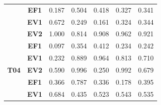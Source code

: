 \begin{table}[htbp]
\begin{tabular}{|ccccccc|}
		\rowcolor[HTML]{F2F2F2} 
		\multicolumn{1}{|c|}{\cellcolor[HTML]{F2F2F2}} & \multicolumn{1}{c|}{\cellcolor[HTML]{F2F2F2}\textbf{EF1}} & \multicolumn{1}{c|}{\cellcolor[HTML]{F2F2F2}0.187} & \multicolumn{1}{c|}{\cellcolor[HTML]{F2F2F2}0.504} & \multicolumn{1}{c|}{\cellcolor[HTML]{F2F2F2}0.418} & \multicolumn{1}{c|}{\cellcolor[HTML]{F2F2F2}0.327} & 0.341 \\ \cline{2-7} 
		\multicolumn{1}{|c|}{\cellcolor[HTML]{F2F2F2}} & \multicolumn{1}{c|}{\textbf{EV1}} & \multicolumn{1}{c|}{0.672} & \multicolumn{1}{c|}{0.249} & \multicolumn{1}{c|}{0.161} & \multicolumn{1}{c|}{0.324} & 0.344 \\ \cline{2-7} 
		\rowcolor[HTML]{F2F2F2} 
		\multicolumn{1}{|c|}{\multirow{-3}{*}{\cellcolor[HTML]{F2F2F2}\textbf{T03}}} & \multicolumn{1}{c|}{\cellcolor[HTML]{F2F2F2}\textbf{EV2}} & \multicolumn{1}{c|}{\cellcolor[HTML]{F2F2F2}1.000} & \multicolumn{1}{c|}{\cellcolor[HTML]{F2F2F2}0.814} & \multicolumn{1}{c|}{\cellcolor[HTML]{F2F2F2}0.908} & \multicolumn{1}{c|}{\cellcolor[HTML]{F2F2F2}0.962} & 0.921 \\ \hline
		\multicolumn{1}{|c|}{\cellcolor[HTML]{F2F2F2}} & \multicolumn{1}{c|}{\textbf{EF1}} & \multicolumn{1}{c|}{0.097} & \multicolumn{1}{c|}{0.354} & \multicolumn{1}{c|}{0.412} & \multicolumn{1}{c|}{0.234} & 0.242 \\ \cline{2-7} 
		\rowcolor[HTML]{F2F2F2} 
		\multicolumn{1}{|c|}{\cellcolor[HTML]{F2F2F2}} & \multicolumn{1}{c|}{\cellcolor[HTML]{F2F2F2}\textbf{EV1}} & \multicolumn{1}{c|}{\cellcolor[HTML]{F2F2F2}0.232} & \multicolumn{1}{c|}{\cellcolor[HTML]{F2F2F2}0.889} & \multicolumn{1}{c|}{\cellcolor[HTML]{F2F2F2}0.964} & \multicolumn{1}{c|}{\cellcolor[HTML]{F2F2F2}0.813} & 0.710 \\ \cline{2-7} 
		\multicolumn{1}{|c|}{\multirow{-3}{*}{\cellcolor[HTML]{F2F2F2}\textbf{T04}}} & \multicolumn{1}{c|}{\textbf{EV2}} & \multicolumn{1}{c|}{0.590} & \multicolumn{1}{c|}{0.996} & \multicolumn{1}{c|}{0.250} & \multicolumn{1}{c|}{0.992} & 0.679 \\ \hline
		\rowcolor[HTML]{F2F2F2} 
		\multicolumn{1}{|c|}{\cellcolor[HTML]{F2F2F2}} & \multicolumn{1}{c|}{\cellcolor[HTML]{F2F2F2}\textbf{EF1}} & \multicolumn{1}{c|}{\cellcolor[HTML]{F2F2F2}0.366} & \multicolumn{1}{c|}{\cellcolor[HTML]{F2F2F2}0.787} & \multicolumn{1}{c|}{\cellcolor[HTML]{F2F2F2}0.336} & \multicolumn{1}{c|}{\cellcolor[HTML]{F2F2F2}0.178} & 0.395 \\ \cline{2-7} 
		\multicolumn{1}{|c|}{\cellcolor[HTML]{F2F2F2}} & \multicolumn{1}{c|}{\textbf{EV1}} & \multicolumn{1}{c|}{0.684} & \multicolumn{1}{c|}{0.435} & \multicolumn{1}{c|}{0.523} & \multicolumn{1}{c|}{0.543} & 0.535 \\ \cline{2-7} 

\end{tabular}
\end{table}
